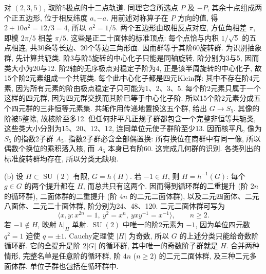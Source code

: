 \begin{solution}
对 $(2,3,5)$, 取阶5极点的十二点轨道. 同理它含所选点 $P$ 及 $-P$, 其余十点组成两个正五边形, 位于相反纬度 $a,-a$. 用前述对称算子在 $P$ 方向的值, 得 $2+10a^2=12/3=4$, 所以 $a^2=1/5$. 两个五边形由取相反点对应, 方位角相差 $\pi$, 即模 $2\pi/5$ 相差 $\pi/5$. 这些是正二十面体的标准顶点: 每个点恰与内积 $1/\sqrt5$ 的五点相连, 共30条等长边、20个等边三角形面. 因而群等于其阶60旋转群. 为识别抽象群, 先计算共轭类. 阶3与阶5旋转的中心化子只能是同轴旋转, 阶分别为3与5, 因而类大小为20与12. 阶2轴的无序极点对稳定子阶为4, 正是该半周旋转的中心化子, 故15个阶2元素组成一个共轭类. 每个此中心化子都是四元Klein群: 其中不存在阶4元素, 因为所有元素的阶由极点稳定子只可能为1、2、3、5. 每个阶2元素只属于一个这样的四元群, 因为四元群交换而其阶已等于中心化子阶. 所以15个阶2元素分成五个四元群的三非恒等元素集. 共轭作用传递地置换这五个群, 给出 $G\to S_5$. 其像的阶被5整除, 故核阶至多12. 但任何非平凡正规子群都包含一个完整非恒等共轭类, 这些类大小分别为15、20、12、12, 连同单位元使子群阶至少13. 因而核平凡, 像为 $S_5$ 的指数2子群 $A_5$. 指数2子群必含全部偶置换: 所有换位在商群中有同一像, 所以偶数个换位的乘积落入核, 而 $A_5$ 本身已有阶60. 这完成几何群的识别. 各类列出的标准旋转群均存在, 所以分类无缺项.

(b) 设 $H\subset\operatorname{SU}(2)$ 有限, $G=h(H)$. 若 $-1\in H$, 则 $H=h^{-1}(G)$: 每个 $g\in G$ 的两个提升都在 $H$, 而总共只有这两个. 因而得到循环群的二重提升 (阶 $2n$ 的循环群), 二面体群的二重提升 (阶 $4n$ 的二元二面体群), 以及二元四面体、二元八面体、二元二十面体群, 阶分别为24、48、120. 二元二面体群可写为
\[
 \langle x,y:x^{2n}=1,\ y^2=x^n,\ yxy^{-1}=x^{-1}\rangle,
 \qquad n\ge2.
\]
若 $-1\notin H$, 映射 $h|_H$ 单射. $\operatorname{SU}(2)$ 中唯一的阶2元素为 $-1$, 因为单位四元数 $q^2=1$ 迫使 $q=\pm1$. Cauchy定理使 $|H|$ 为奇数, 所以 $G$ 的上述分类只能给奇数阶循环群. 它的全提升是阶 $2|G|$ 的循环群, 其中唯一的奇数阶子群就是 $H$. 合并两种情形, 完整名单是任意阶的循环群, 阶 $4n$ ($n\ge2$) 的二元二面体群, 及三种二元多面体群. 单位子群也包括在循环群中.
\end{solution}

